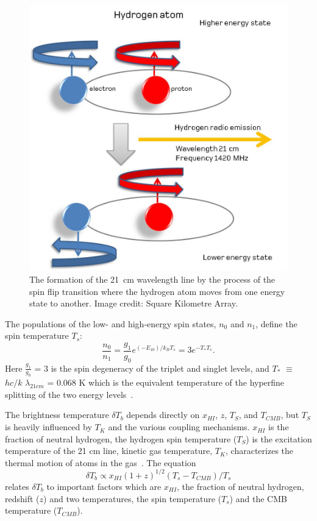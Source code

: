 \begin{figure}
	\begin{center}
		\includegraphics[width=0.5\linewidth]{Figures/Hydrogenemission1.jpeg}
		\caption{The formation of the \SI{21}{cm} wavelength line by the process of the spin flip transition where the hydrogen atom moves from one energy state to another. Image credit: {Square Kilometre Array}.}
		\label{Fig:21cm}
	\end{center}
\end{figure}

The populations of the low- and high-energy spin states, $n_0$ and $n_1$, define the spin temperature $T_s$:
\begin{equation}
\frac{n_0}{n_1} = \frac{g_1}{g_0}e^{(-E_10)/{k_B}{T_s}} = 3e^{{-T_*}{T_s}}.
\end{equation}
Here $\frac{g_1}{g_0}$ = 3 is the spin degeneracy of the triplet and singlet levels, and $T_{*}$ $\equiv$ $hc/k$ $\lambda_{21cm}$ = 0.068 K which is the equivalent temperature of the hyperfine splitting of the two energy levels~\citep{2012RPPh...75h6901P}.

The brightness temperature $\delta$$T_b$ depends directly on $x_{HI}$, $z$, $T_S$, and $T_{CMB}$, but $T_S$ is heavily influenced by $T_K$ and the various coupling mechanisms. $x_{HI}$ is the fraction of neutral hydrogen, the hydrogen spin temperature ($T_S$) is the excitation temperature of the 21 cm line, kinetic gas temperature, $T_K$, characterizes the thermal motion of atoms in the gas~\citep{2015aska.confE...1K,2006PhR...433..181F}. The equation	
\begin{equation}
\delta{T_b}\propto {x_{HI}}(1+z)^{1/2}({T_s}-{T_{CMB}})/{T_s}
\end{equation}
relates $\delta$$T_b$ to important factors which are \(x_{HI}\), the fraction of neutral hydrogen, redshift ($z$) and two temperatures, the spin temperature ($T_s$) and the CMB temperature ($T_{CMB}$).

